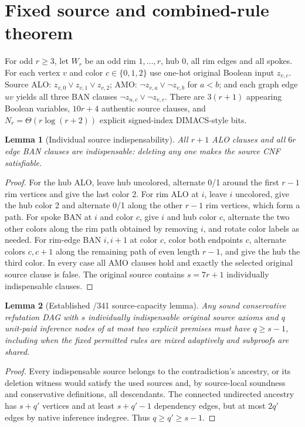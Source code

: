 \documentclass[11pt]{article}
\newtheorem{lemma}{Lemma}
\begin{document}
\section*{Fixed source and combined-rule theorem}
For odd $r\ge3$, let $W_r$ be an odd rim $1,\ldots,r$, hub $0$, all rim edges and all spokes. For each vertex $v$ and color $c\in\{0,1,2\}$ use one-hot original Boolean input $z_{v,c}$. Source ALO: $z_{v,0}\vee z_{v,1}\vee z_{v,2}$; AMO: $\neg z_{v,a}\vee\neg z_{v,b}$ for $a<b$; and each graph edge $uv$ yields all three BAN clauses $\neg z_{u,c}\vee\neg z_{v,c}$. There are $3(r+1)$ appearing Boolean variables, $10r+4$ authentic source clauses, and $N_r=\Theta(r\log(r+2))$ explicit signed-index DIMACS-style bits.
\begin{lemma}[Individual source indispensability]
All $r+1$ ALO clauses and all $6r$ edge BAN clauses are indispensable: deleting any one makes the source CNF satisfiable.
\end{lemma}
\begin{proof}
For the hub ALO, leave hub uncolored, alternate 0/1 around the first $r-1$ rim vertices and give the last color 2. For rim ALO at $i$, leave $i$ uncolored, give the hub color 2 and alternate 0/1 along the other $r-1$ rim vertices, which form a path. For spoke BAN at $i$ and color $c$, give $i$ and hub color $c$, alternate the two other colors along the rim path obtained by removing $i$, and rotate color labels as needed. For rim-edge BAN $i,i+1$ at color $c$, color both endpoints $c$, alternate colors $c,c+1$ along the remaining path of even length $r-1$, and give the hub the third color. In every case all AMO clauses hold and exactly the selected original source clause is false. The original source contains $s=7r+1$ individually indispensable clauses.
\end{proof}
\begin{lemma}[Established /341 source-capacity lemma]
Any sound conservative refutation DAG with $s$ individually indispensable original source axioms and $q$ unit-paid inference nodes of at most two explicit premises must have $q\ge s-1$, including when the fixed permitted rules are mixed adaptively and subproofs are shared.
\end{lemma}
\begin{proof}
Every indispensable source belongs to the contradiction's ancestry, or its deletion witness would satisfy the used sources and, by source-local soundness and conservative definitions, all descendants. The connected undirected ancestry has $s+q'$ vertices and at least $s+q'-1$ dependency edges, but at most $2q'$ edges by native inference indegree. Thus $q\ge q'\ge s-1$.
\end{proof}
\end{document}
